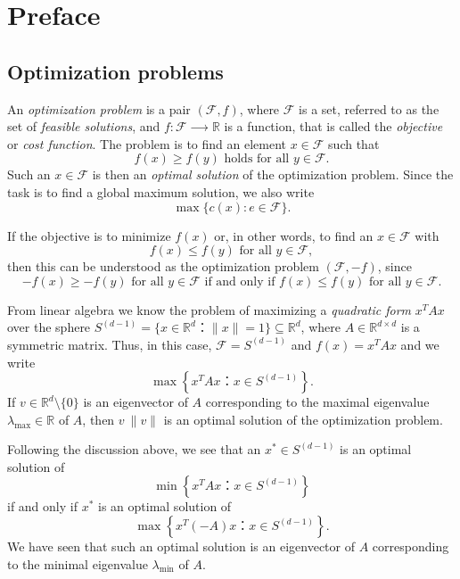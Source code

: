 
\chapter{Preface}
\label{cha:preface}


\section{Optimization problems}
\label{sec:optim-probl}

An \emph{optimization problem} is a pair $(ℱ,f)$, where $ℱ$ is a set, referred to as the set of \emph{feasible solutions},  and $f: ℱ ⟶ ℝ$ is a function, that is called the \emph{objective} or \emph{cost function}. The problem is to find an element $x ∈ ℱ$ such that
\begin{displaymath}
  f(x) ≥ f(y) \text{ holds for all } y ∈ ℱ. 
\end{displaymath}
Such an $x∈ ℱ$  is then an \emph{optimal solution} of the optimization problem.
Since the task is to find a global  maximum solution, we also write 
\begin{displaymath}
  \max \{ c(x) : e ∈ ℱ\}. 
\end{displaymath}

If the objective is to minimize $f(x)$ or, in other words, to find an $x ∈ ℱ$ with  
\begin{displaymath}
  f(x) ≤ f(y) \text{ for all } y ∈ ℱ,
\end{displaymath}
then this can be understood as the optimization problem $(ℱ,-f)$, since 
\begin{displaymath}
  -f(x) ≥ - f(y) \text{ for all } y ∈ ℱ \text{ if and only if }  f(x) ≤ f(y) \text{ for all } y ∈ ℱ. 
\end{displaymath}

\begin{example}
  \label{exe:1}
  From linear algebra we know the problem of maximizing  a
  \emph{quadratic form} $ x^T A x$ over the sphere
  $S^{(d-1)} = \{ x ∈ ℝ^d ： \|x\| = 1 \} ⊆ ℝ^d$, where $A ∈ ℝ^{d×d}$ is a symmetric
  matrix.  Thus, in this case,   $ℱ = S^{(d-1)}$ and $f(x) = x^T A x$ and we write
  \begin{displaymath}
    \max\left\{ x^T A x ： x ∈S^{(d-1)} \right\}. 
  \end{displaymath}
  If $v ∈ ℝ^d \setminus \{0\}$ is an eigenvector of $A$ corresponding to the
  maximal eigenvalue $λ_{\max} ∈ ℝ$ of $A$, then $v \ \|v\|$ is an optimal
  solution of the optimization problem.

  Following the discussion above, we see that an $x^* ∈ S^{(d-1)}$ is an optimal solution of
  \begin{displaymath}
    \min\left\{ x^T A x ： x ∈S^{(d-1)} \right\} 
  \end{displaymath}
  if and only if $x^*$ is an optimal solution of
   \begin{displaymath}
    \max\left\{ x^T (-A) x ： x ∈S^{(d-1)} \right\} . 
  \end{displaymath}
  We have seen that such an optimal solution is an eigenvector of $A$ corresponding to the minimal eigenvalue $λ_{\min}$ of $A$. 
\end{example}


